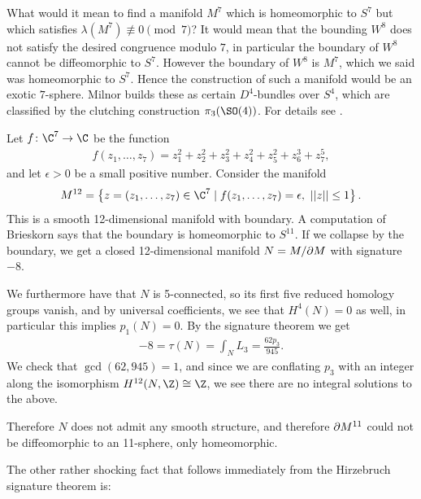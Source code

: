 \documentclass[11pt]{book}
\begin{document}
\begin{example}
What would it mean to find a manifold $M^7$ which is homeomorphic to $S^7$ but which satisfies $\lambda(M^7) \not\equiv 0 \pmod{7}$? It would mean that the bounding $W^8$ does not satisfy the desired congruence modulo $7$, in particular the boundary of $W^8$ cannot be diffeomorphic to $S^7$. However the boundary of $W^8$ is $M^7$, which we said was homeomorphic to $S^7$. Hence the construction of such a manifold would be an exotic $7$-sphere. Milnor builds these as certain $D^4$-bundles over $S^4$, which are classified by the clutching construction $\pi_3(\SO(4))$. For details see \cite{milnorManifoldsHomeomorphic7Sphere1956}.
\end{example}

\begin{example} Let $f \colon \C^7 \to \C$ be the function
\begin{align*}
    f(z_1, \ldots, z_7) = z_1^2 + z_2^2 + z_3^2 + z_4^2 + z_5^2 + z_6^3 + z_7^5,
\end{align*}
and let $\epsilon>0$ be a small positive number. Consider the manifold
\begin{align*}
    M^{12} = \left\{ z = (z_1, \ldots, z_7) \in \C^7 \mid f(z_1, \ldots, z_7) = \epsilon,\ ||z||\le 1 \right\}.
\end{align*}
This is a smooth 12-dimensional manifold with boundary. A computation of Brieskorn says that the boundary is homeomorphic to $S^{11}$. If we collapse by the boundary, we get a closed 12-dimensional manifold $N = M/\partial M$ with signature $-8$.

We furthermore have that $N$ is 5-connected, so its first five reduced homology groups vanish, and by universal coefficients, we see that $H^4(N)=0$ as well, in particular this implies $p_1(N) = 0$. By the signature theorem we get
\begin{align*}
    -8 = \tau(N) = \int_N L_3 = \frac{62p_3}{945}.
\end{align*}
We check that $\gcd(62,945)=1$, and since we are conflating $p_3$ with an integer along the isomorphism $H^{12}(N,\Z) \cong \Z$, we see there are no integral solutions to the above.

Therefore $N$ does not admit any smooth structure, and therefore $\partial M^{11}$ could not be diffeomorphic to an 11-sphere, only homeomorphic.
\end{example}

The other rather shocking fact that follows immediately from the Hirzebruch signature theorem is:
\end{document}
